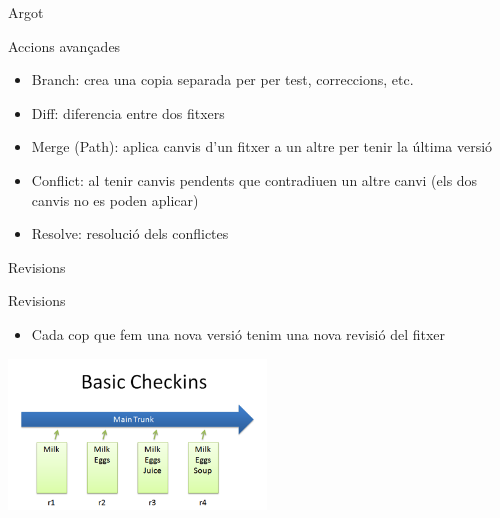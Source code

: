 \documentclass[10pt,xcolor={rgb}]{beamer}
\begin{document}
    \begin{frame}[fragile]{Argot}
      
            \begin{block}{Accions avançades}
      
              \begin{itemize}
                \item Branch: crea una copia separada per per test, correccions, etc.
                \item Diff: diferencia entre dos fitxers
                \item Merge (Path): aplica canvis d'un fitxer a un altre per tenir la última versió
                \item Conflict: al tenir canvis pendents que contradiuen un altre canvi (els dos canvis no es poden aplicar)
                \item Resolve:  resolució dels conflictes
              \end{itemize}
            \end{block}
      
    \end{frame}


    \begin{frame}[fragile]{Revisions}
      
            \begin{block}{Revisions}
      
              \begin{itemize}
                \item Cada cop que fem una nova versió tenim una nova revisió del fitxer
              \end{itemize}

              \centering
              \includegraphics[height=4cm]{basic_checkin.png}
      
            \end{block}
      
    \end{frame}
\end{document}
